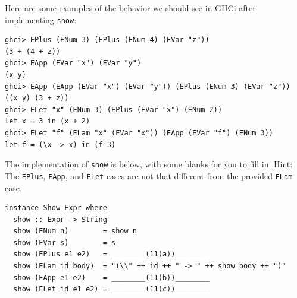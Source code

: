 \documentclass[addpoints]{exam}
\begin{document}
\begin{questions}
Here are some examples of the behavior we should see in GHCi after implementing \verb|show|:

\begin{verbatim}
ghci> EPlus (ENum 3) (EPlus (ENum 4) (EVar "z"))
(3 + (4 + z))
ghci> EApp (EVar "x") (EVar "y")
(x y)
ghci> EApp (EApp (EVar "x") (EVar "y")) (EPlus (ENum 3) (EVar "z"))
((x y) (3 + z))
ghci> ELet "x" (ENum 3) (EPlus (EVar "x") (ENum 2))
let x = 3 in (x + 2)
ghci> ELet "f" (ELam "x" (EVar "x")) (EApp (EVar "f") (ENum 3))
let f = (\x -> x) in (f 3)
\end{verbatim}

The implementation of \verb|show| is below, with some blanks for you to fill in. Hint: The \verb|EPlus|, \verb|EApp|, and \verb|ELet| cases are not that different from the provided \verb|ELam| case.

\begin{verbatim}
instance Show Expr where
  show :: Expr -> String
  show (ENum n)        = show n
  show (EVar s)        = s
  show (EPlus e1 e2)   = ________(11(a))________
  show (ELam id body)  = "(\\" ++ id ++ " -> " ++ show body ++ ")"
  show (EApp e1 e2)    = ________(11(b))________
  show (ELet id e1 e2) = ________(11(c))________
\end{verbatim}

\end{questions}
\end{document}
